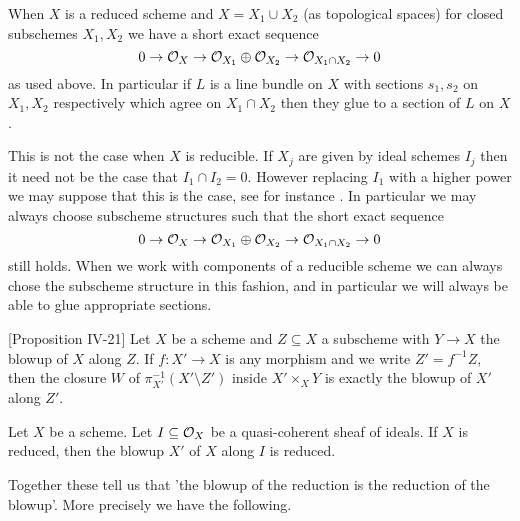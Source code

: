\begin{remark}\label{powers}
	
	When $X$ is a reduced scheme and $X=X_{1} \cup X_{2}$ (as topological spaces) for closed subschemes $X_{1},X_{2}$ we have a short exact sequence 
	\[0 \to \ox \to \ox[X_{1}]\oplus \ox[X_{2}] \to \ox[X_{1}\cap X_{2}] \to 0\]
	as used above. In particular if $L$ is a line bundle on $X$ with sections $s_{1},s_{2}$ on $X_{1},X_{2}$ respectively which agree on $X_{1}\cap X_{2}$ then they glue to a section of $L$ on $X$.
	
	This is not the case when $X$ is reducible. If $X_{j}$ are given by ideal schemes $I_{j}$ then it need not be the case that $I_{1} \cap I_{2} = 0$. However replacing $I_{1}$ with a higher power we may suppose that this is the case, see for instance \cite[Tag 01YC]{stacks-project}. In particular we may always choose subscheme structures such that the short exact sequence
	\[0 \to \ox \to \ox[X_{1}]\oplus \ox[X_{2}] \to \ox[X_{1}\cap X_{2}] \to 0\]
	still holds. When we work with components of a reducible scheme we can always chose the subscheme structure in this fashion, and in particular we will always be able to glue appropriate sections.
	
\end{remark}

\begin{lemma}\label{Blowup-close}\cite{eisenbud2006geometry}[Proposition IV-21]
	Let $X$ be a scheme and $Z \subseteq X$ a subscheme with $Y \to X$ the blowup of $X$ along $Z$. If $f:X' \to X$ is any morphism and we write $Z'=f^{-1}Z$, then the closure $W$ of $\pi_{X'}^{-1}(X'\setminus Z')$ inside $X' \times_{X} Y$ is exactly the blowup of $X'$ along $Z'$.
\end{lemma}

\begin{lemma}\label{Blowup-red}\cite[Tag 0808]{stacks-project}
	Let $X$ be a scheme. Let $I\subseteq \ox$ be a quasi-coherent sheaf of ideals. If $X$ is reduced, then the blowup $X'$ of $X$ along $I$ is reduced.
	
\end{lemma}

Together these tell us that 'the blowup of the reduction is the reduction of the blowup'. More precisely we have the following.

